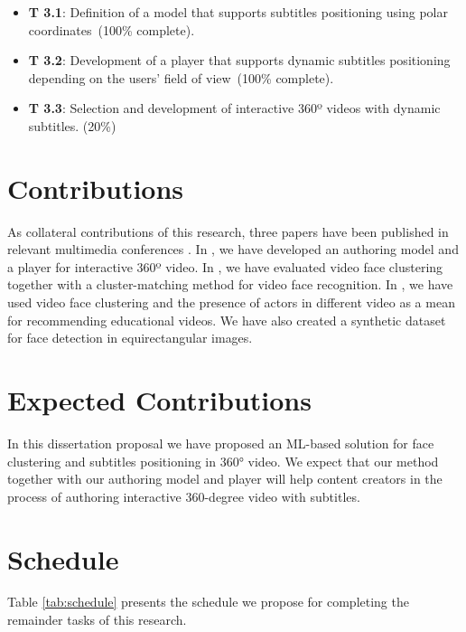 \begin{itemize}
    \item \textbf{T 3.1}: Definition of a model that supports subtitles positioning using polar coordinates~(100\% complete).
    \item \textbf{T 3.2}: Development of a player that supports dynamic subtitles positioning depending on the users' field of view~(100\% complete).
    \item \textbf{T 3.3}: Selection and development of interactive 360º videos with dynamic subtitles. (20\%)
\end{itemize}

\section{Contributions}
\label{sec_4}
 As collateral contributions of this research, three papers have been published in relevant multimedia conferences \cite{mendes2020cluster, mendes_2020, mendes2020ISM}. In \cite{mendes_2020}, we have developed an authoring model and a player for interactive 360º video. In \cite{mendes2020cluster}, we have evaluated video face clustering together with a cluster-matching method for video face recognition. In \cite{mendes2020ISM}, we have used video face clustering and the presence of actors in different video as a mean for recommending educational videos. We have also created a synthetic dataset for face detection in equirectangular images.

\section{Expected Contributions}
\label{sec_5}
In this dissertation proposal we have proposed an ML-based solution for face clustering and subtitles positioning in 360° video. We expect that our method together with our authoring model and player will help content creators in the process of authoring interactive 360-degree video with subtitles.


\section{Schedule}
\label{sec_6}
Table \ref{tab:schedule} presents the schedule we propose for completing the remainder tasks of this research.

